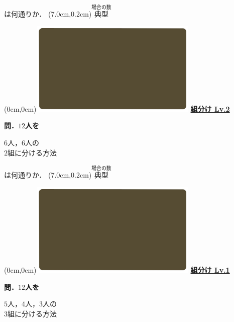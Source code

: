 \documentclass[10pt,
fleqn,
dvipdfmx,
uplatex
]{jsarticle}
\begin{document}
\large
\vspace{0.1zw}
\hfill は何通りか．
\at(7.0cm,0.2cm){\small\color{bradorange}$\overset{\text{場合の数}}{\text{典型}}$}


\newpage



\at(0cm,0cm){\includegraphics[width=8cm,bb=0 0 1920 1080]{./youtube/thumbnails/templates/smart_background/場合の数.jpeg}}
{\color{orange}\bf\boldmath\huge\underline{組分け Lv.2 }}\vspace{0.3zw}

\large 
\bf\boldmath 問．${12}$人を

\Huge
\vspace{-0.3zw}
\hspace{0.1zw} $6$人，$6$人の\vspace{-0.2zw}\\
\hfill $2$組に分ける方法\hspace{0.1zw} 

\large
\vspace{0.1zw}
\hfill は何通りか．
\at(7.0cm,0.2cm){\small\color{bradorange}$\overset{\text{場合の数}}{\text{典型}}$}


\newpage



\at(0cm,0cm){\includegraphics[width=8cm,bb=0 0 1920 1080]{./youtube/thumbnails/templates/smart_background/場合の数.jpeg}}
{\color{orange}\bf\boldmath\huge\underline{組分け Lv.1 }}\vspace{0.3zw}

\large 
\bf\boldmath 問．${12}$人を

\Huge
\vspace{-0.3zw}
\hspace{0.1zw} $5$人，$4$人，$3$人の\vspace{-0.2zw}\\
\hfill $3$組に分ける方法\hspace{0.1zw} 
\end{document}
